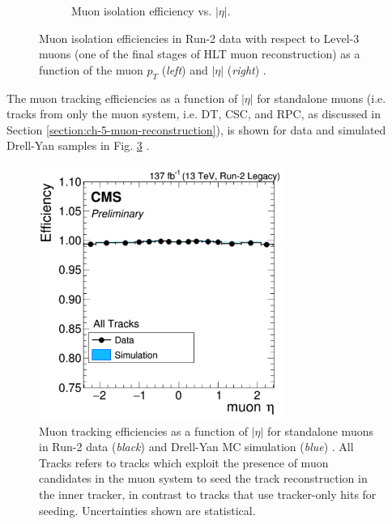 \begin{figure}[h]
\begin{subfigure}{0.45\textwidth}
        \caption{Muon isolation efficiency vs. $|\eta|$.}
        \label{fig:muon_isolation_efficiency_vsEta}
    \end{subfigure}
    \caption[Muon isolation efficiencies in Run-2 data as a function of the muon $p_{T}$ (\textit{left}) and $|\eta|$ (\textit{right}).]{Muon isolation efficiencies in Run-2 data with respect to Level-3 muons (one of the final stages of HLT muon reconstruction) as a function of the muon $p_{T}$ (\textit{left}) and $|\eta|$ (\textit{right}) \cite{CMS-MUO-16-001}.} 
\end{figure}

The muon tracking efficiencies as a function of $|\eta|$ for standalone muons (i.e. tracks from only the muon system, i.e. DT, CSC, and RPC, as discussed in Section \ref{section:ch-5-muon-reconstruction}), is shown for data and simulated Drell-Yan samples in Fig. \ref{fig:muon_tracking_efficiency} \cite{CMS-DP-2020-035}. 

\begin{figure}[h]
    \centering
    \includegraphics[width=8cm]{figures/ch-5-object-reconstruction-and-corrections-applied/muon_tracking_efficiency}
    \caption[Muon tracking efficiencies as a function of $|\eta|$ for standalone muons in Run-2 data (\textit{black}) and Drell-Yan (\textit{blue}) MC simulation.]{Muon tracking efficiencies as a function of $|\eta|$ for standalone muons in Run-2 data (\textit{black}) and Drell-Yan MC simulation (\textit{blue}) \cite{CMS-DP-2020-035}. All Tracks refers to tracks which exploit the presence of muon candidates in the muon system to seed the track reconstruction in the inner tracker, in contrast to tracks that use tracker-only hits for seeding. Uncertainties shown are statistical.}
    \label{fig:muon_tracking_efficiency}
\end{figure}

